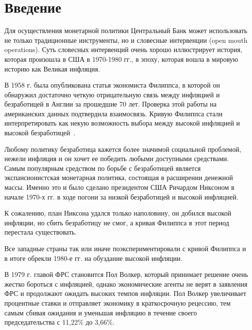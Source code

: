\documentclass[14pt,a4paper, oneside]{extreport}
\theoremstyle{plain}              %
\theoremstyle{definition}         %
\begin{document}
\setcounter{page}{2} %

\newpage

\thispagestyle{fancy}

\tableofcontents


\chapter*{Введение}


Для осуществления монетарной политики Центральный Банк может использовать не только традиционные инструменты, но и словесные интервенции (open mouth operations). Суть словесных интервенций очень хорошо иллюстрирует история, которая произошла в США в 1970-1980 гг., в эпоху, которая вошла в мировую историю как Великая инфляция. 

В 1958 г. была опубликована статья экономиста Филиппса, в которой он обнаружил достаточно четкую отрицательную связь между инфляцией и безработицей в Англии за прошедшие 70 лет. Проверка этой работы на американских данных подтвердила взаимосвязь. Кривую Филиппса стали интерпретировать как некую возможность выбора между высокой инфляцией и высокой безработицей~\cite{phillips1958relation}.

Любому политику безработица кажется более значимой социальной проблемой, нежели инфляция и он хочет ее победить любыми доступными средствами. Самым популярным средством по борьбе с безработицей является экспансионистская монетарная политика, состоящая в расширении денежной массы. Именно это и было сделано президентом США Ричардом Никсоном в начале 1970-х гг. в ходе погони за низкой безработицей и высокой инфляцией.

К сожалению, план Никсона удался только наполовину, он добился высокой инфляции, но сбить безработицу не смог, а кривая Филиппса в этот период перестала существовать. 

Все западные страны так или иначе поэкспериментировали с кривой Филиппса и в итоге обрекли 1980-е гг. на обуздание высокой инфляции.

В 1979 г. главой ФРС становится Пол Волкер, который принимает решение очень жестко бороться с инфляцией, однако экономические агенты не верят в заявления ФРС и продолжают ожидать высоких темпов инфляции. Пол Волкер увеличивает процентные ставки и отправляет экономику в краткосрочную рецессию, тем самым сбивая ожидания и уменьшая инфляцию в течение своего председательства с 11,22\% до 3,66\%. 
\end{document}
